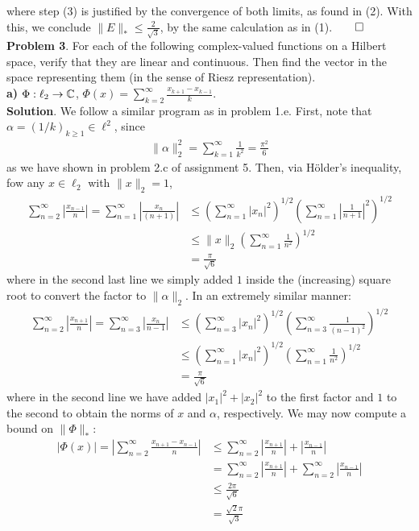 \documentclass[10pt]{article}
\newcommand{\1}[1]{\mathbbm{1}_{#1}} \newcommand{\mc}[1]{\mathcal{#1}}
\begin{document}
    where step (3) is justified by the convergence of both limits, as found in (2). With this, we conclude $\|E\|_\ast\leq \frac{2}{\sqrt{3}}$, by the same calculation as in (1).\hfill{$\qed$}\\[5pt]
    {\bf Problem 3}. For each of the following complex-valued functions on a Hilbert space, verify that they are linear and continuous. Then find the vector in the space representing them (in the sense of Riesz representation).\\[5pt]
    {\bf a)} $\Phi:\ell_2\rightarrow\mathbb{C}$, $\Phi(x)=\sum_{k=2}^\infty\frac{x_{k+1}-x_{k-1}}{k}$.\\[5pt]
    {\bf Solution}. We follow a similar program as in problem 1.e. First, note that $\alpha=(1/k)_{k\geq 1}\in\ell^2$, since
    \begin{align*}
        \|\alpha\|_2^2=\sum_{k=1}^\infty\frac{1}{k^2}=\frac{\pi^2}{6}
    \end{align*}
    as we have shown in problem 2.c of assignment 5. Then, via H\"older's inequality, fow any $x\in\ell_2$ with $\|x\|_2=1$,
    \begin{align*}
        \sum_{n=2}^\infty\left|\frac{x_{n-1}}{n}\right|=\sum_{n=1}^\infty\left|\frac{x_n}{(n+1)}\right|&\leq\left(\sum_{n=1}^\infty|x_n|^2\right)^{1/2}\left(\sum_{n=1}^\infty\left|\frac{1}{n+1}\right|^2\right)^{1/2}\\
        &\leq\|x\|_2\left(\sum_{n=1}^\infty\frac{1}{n^2}\right)^{1/2}\\
        &=\frac{\pi}{\sqrt{6}}\tag{4}
    \end{align*}
    where in the second last line we simply added $1$ inside the (increasing) square root to convert the factor to $\|\alpha\|_2$. In an extremely similar manner:
    \begin{align*}
        \sum_{n=2}^\infty\left|\frac{x_{n+1}}{n}\right|=\sum_{n=3}^\infty\left|\frac{x_n}{n-1}\right|&\leq\left(\sum_{n=3}^\infty|x_n|^2\right)^{1/2}\left(\sum_{n=3}^\infty\frac{1}{(n-1)^2}\right)^{1/2}\\
        &\leq \left(\sum_{n=1}^\infty|x_n|^2\right)^{1/2}\left(\sum_{n=1}^\infty\frac{1}{n^2}\right)^{1/2}\\
        &=\frac{\pi}{\sqrt{6}}\tag{5}
    \end{align*}
    where in the second line we have added $|x_1|^2+|x_2|^2$ to the first factor and $1$ to the second to obtain the norms of $x$ and $\alpha$, respectively. We may now compute a bound on $\|\Phi\|_\ast$:
    \begin{align*}
        |\Phi(x)|=\left|\sum_{n=2}^\infty\frac{x_{n+1}-x_{n-1}}{n}\right|&\leq\sum_{n=2}^\infty\left|\frac{x_{n+1}}{n}\right|+\left|\frac{x_{n-1}}{n}\right|\\
        &=\sum_{n=2}^\infty\left|\frac{x_{n+1}}{n}\right|+\sum_{n=2}^\infty\left|\frac{x_{n-1}}{n}\right|\tag{6}\\
        &\leq\frac{2\pi}{\sqrt{6}}\\
        &=\frac{\sqrt{2}\pi}{\sqrt{3}}
    \end{align*}
\end{document}
